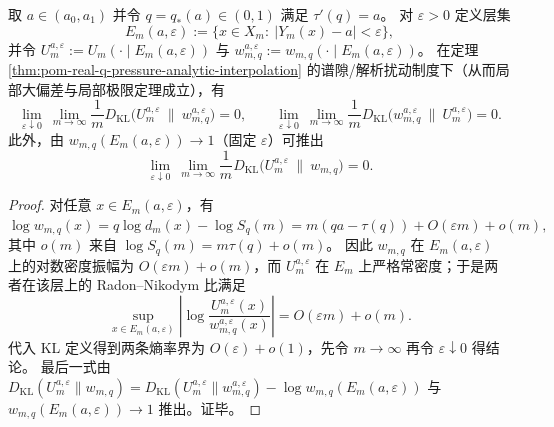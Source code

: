 \begin{theorem}\label{thm:pom-microcanonical-escort-kl-rate-zero}
取 \(a\in(a_0,a_1)\) 并令 \(q=q_*(a)\in(0,1)\) 满足 \(\tau'(q)=a\)。
对 \(\varepsilon>0\) 定义层集
\[
E_m(a,\varepsilon):=\{x\in X_m:\ |Y_m(x)-a|<\varepsilon\},
\]
并令
\(
U_m^{a,\varepsilon}:=U_m(\cdot\mid E_m(a,\varepsilon))
\)
与
\(
w_{m,q}^{a,\varepsilon}:=w_{m,q}(\cdot\mid E_m(a,\varepsilon))
\)。
在定理 \ref{thm:pom-real-q-pressure-analytic-interpolation} 的谱隙/解析扰动制度下（从而局部大偏差与局部极限定理成立），有
\[
\lim_{\varepsilon\downarrow 0}\ \lim_{m\to\infty}\frac{1}{m}D_{\mathrm{KL}}\!\bigl(U_m^{a,\varepsilon}\ \|\ w_{m,q}^{a,\varepsilon}\bigr)=0,
\qquad
\lim_{\varepsilon\downarrow 0}\ \lim_{m\to\infty}\frac{1}{m}D_{\mathrm{KL}}\!\bigl(w_{m,q}^{a,\varepsilon}\ \|\ U_m^{a,\varepsilon}\bigr)=0.
\]
此外，由 \(w_{m,q}(E_m(a,\varepsilon))\to 1\)（固定 \(\varepsilon\)）可推出
\[
\lim_{\varepsilon\downarrow 0}\ \lim_{m\to\infty}\frac{1}{m}D_{\mathrm{KL}}\!\bigl(U_m^{a,\varepsilon}\ \|\ w_{m,q}\bigr)=0.
\]
\end{theorem}
\begin{proof}
对任意 \(x\in E_m(a,\varepsilon)\)，有
\(
\log w_{m,q}(x)=q\log d_m(x)-\log S_q(m)
= m(q a-\tau(q))+O(\varepsilon m)+o(m),
\)
其中 \(o(m)\) 来自 \(\log S_q(m)=m\tau(q)+o(m)\)。
因此 \(w_{m,q}\) 在 \(E_m(a,\varepsilon)\) 上的对数密度振幅为 \(O(\varepsilon m)+o(m)\)，而 \(U_m^{a,\varepsilon}\) 在 \(E_m\) 上严格常密度；于是两者在该层上的 Radon--Nikodym 比满足
\[
\sup_{x\in E_m(a,\varepsilon)}\left|\log\frac{U_m^{a,\varepsilon}(x)}{w_{m,q}^{a,\varepsilon}(x)}\right|
=O(\varepsilon m)+o(m).
\]
代入 KL 定义得到两条熵率界为 \(O(\varepsilon)+o(1)\)，先令 \(m\to\infty\) 再令 \(\varepsilon\downarrow 0\) 得结论。
最后一式由
\(
D_{\mathrm{KL}}(U_m^{a,\varepsilon}\|w_{m,q})
=D_{\mathrm{KL}}(U_m^{a,\varepsilon}\|w_{m,q}^{a,\varepsilon})-\log w_{m,q}(E_m(a,\varepsilon))
\)
与 \(w_{m,q}(E_m(a,\varepsilon))\to 1\) 推出。证毕。
\end{proof}

